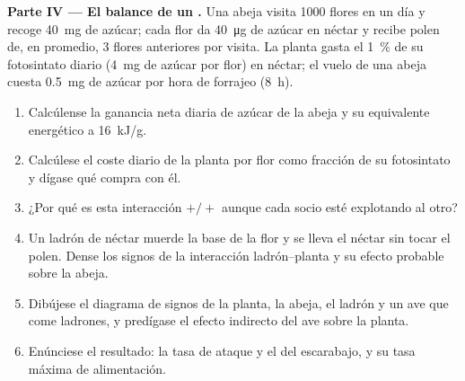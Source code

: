 \begin{problem}
\medskip
\noindent\textbf{Parte IV --- El balance de un .}
Una abeja visita 1000 flores en un día y recoge \qty{40}{mg} de azúcar; cada
flor da \qty{40}{\micro g} de azúcar en néctar y recibe polen de, en
promedio, 3 flores anteriores por visita. La planta gasta el \qty{1}{\%} de
su fotosintato diario (\qty{4}{mg} de azúcar por flor) en néctar; el vuelo
de una abeja cuesta \qty{0.5}{mg} de azúcar por hora de forrajeo
(\qty{8}{h}).
\begin{enumerate}[resume]
  \item Calcúlense la ganancia neta diaria de azúcar de la abeja y su
        equivalente energético a \qty{16}{kJ/g}.
  \item Calcúlese el coste diario de la planta por flor como fracción de su
        fotosintato y dígase qué compra con él.
  \item ¿Por qué es esta interacción $+/+$ aunque cada socio esté explotando
        al otro?
  \item Un ladrón de néctar muerde la base de la flor y se lleva el néctar
        sin tocar el polen. Dense los signos de la interacción
        ladrón--planta y su efecto probable sobre la abeja.
  \item Dibújese el diagrama de signos de la planta, la abeja, el ladrón y
        un ave que come ladrones, y predígase el efecto indirecto del ave
        sobre la planta.
  \item Enúnciese el resultado: la tasa de ataque y el  del escarabajo, y su tasa máxima de alimentación.
\end{enumerate}
\end{problem}
